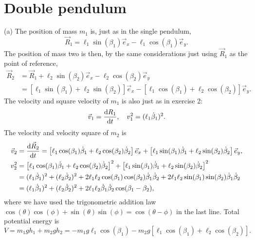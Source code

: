\documentclass{article}
\begin{document}
    \section{Double pendulum}
        (a) The position of mass $m_1$ is, just as in the single pendulum, 
        \begin{equation*}
            \vec R_1 = \ell_1 \sin(\beta_1) \vec e_x - \ell_1 \cos(\beta_1) \vec e_y.
        \end{equation*}
        The position of mass two is then, by the same considerations just using $\vec R_1$ as the point of reference,
        \begin{align*}
            \vec R_2 & = \vec R_1 + \ell_2 \sin(\beta_2) \vec e_x - \ell_2 \cos(\beta_2) \vec e_y \\
            &= \left[\ell_1 \sin(\beta_1) + \ell_2 \sin(\beta_2)\right] \vec e_x - \left[\ell_1 \cos(\beta_1) + \ell_2 \cos(\beta_2)\right] \vec e_y.
        \end{align*}
        The velocity and square velocity of $m_1$ is also just as in exercise 2:
        \begin{equation*}
            \vec v_1 = \dv{R_1}{t}, \quad v_1^2 = (\ell_1 \dot \beta_1)^2.
        \end{equation*}
        The velocity  and velocity square of $m_2$ is
        \begin{align*}
            \vec v_2 &= \dv{\vec R_2}{t} = 
            \left[\ell_1 \cos(\beta_1) \dot \beta_1 + \ell_2 \cos(\beta_2) \dot \beta_2 \right] \vec e_x + \left[\ell_1 \sin(\beta_1) \dot \beta_1 + \ell_2 \sin(\beta_2) \dot \beta_2\right] \vec e_y, \\
            v_2^2 &= \left[\ell_1 \cos(\beta_1) \dot \beta_1 + \ell_2 \cos(\beta_2) \dot \beta_2 \right]^2 + \left[\ell_1 \sin(\beta_1) \dot \beta_1 + \ell_2 \sin(\beta_2) \dot \beta_2\right]^2 \\ 
            &= (\ell_1 \dot \beta_1)^2 + (\ell_2 \dot \beta_2)^2 + 2 \ell_1 \ell_2 \cos(\beta_1)\cos(\beta_2) \dot \beta_1 \dot \beta_2 + 2 \ell_1 \ell_2 \sin(\beta_1)\sin(\beta_2) \dot \beta_1 \dot \beta_2 \\
            &= (\ell_1 \dot \beta_1)^2 + (\ell_2 \dot \beta_2)^2 + 2 \ell_1 \ell_2 \dot \beta_1 \dot \beta_2 \cos(\beta_1 - \beta_2),
        \end{align*}
        where we have used the trigonometric addition law $\cos(\theta) \cos(\phi) + \sin(\theta) \sin(\phi) = \cos(\theta - \phi)$ in the last line. Total potential energy is 
        \begin{equation*}
            V = m_1 g h_1 + m_2 g h_2 = -m_1 g \ell_1 \cos(\beta_1) - m_2 g \left[\ell_1 \cos(\beta_1) + \ell_2 \cos(\beta_2)\right].
        \end{equation*}
\end{document}
